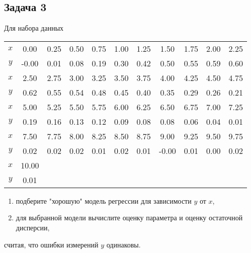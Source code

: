 \documentclass[a4paper,12pt]{article}
\begin{document}
\subsection*{Задача 3}

Для набора данных

\begin{center}
    \begin{tabular}{|c|c|c|c|c|c|c|c|c|c|c|}
        \hline
        $x$ & 0.00  & 0.25                  & 0.50 & 0.75 & 1.00 & 1.25 & 1.50  & 1.75 & 2.00 & 2.25 \\
        $y$ & -0.00 & 0.01                  & 0.08 & 0.19 & 0.30 & 0.42 & 0.50  & 0.55 & 0.59 & 0.60 \\
        \hline
        \hline
        $x$ & 2.50  & 2.75                  & 3.00 & 3.25 & 3.50 & 3.75 & 4.00  & 4.25 & 4.50 & 4.75 \\
        $y$ & 0.62  & 0.55                  & 0.54 & 0.48 & 0.45 & 0.40 & 0.35  & 0.29 & 0.26 & 0.21 \\
        \hline
        \hline
        $x$ & 5.00  & 5.25                  & 5.50 & 5.75 & 6.00 & 6.25 & 6.50  & 6.75 & 7.00 & 7.25 \\
        $y$ & 0.19  & 0.16                  & 0.13 & 0.12 & 0.09 & 0.08 & 0.08  & 0.06 & 0.04 & 0.01 \\
        \hline
        \hline
        $x$ & 7.50  & 7.75                  & 8.00 & 8.25 & 8.50 & 8.75 & 9.00  & 9.25 & 9.50 & 9.75 \\
        $y$ & 0.02  & 0.02                  & 0.02 & 0.01 & 0.02 & 0.01 & -0.00 & 0.01 & 0.00 & 0.02 \\
        \hline
        \hline
        $x$ & 10.00 & \multicolumn{9}{l|}{}                                                          \\
        $y$ & 0.01  & \multicolumn{9}{l|}{}                                                          \\
        \hline
    \end{tabular}
\end{center}

\begin{enumerate}
    \item подберите "хорошую"{} модель регрессии для зависимости $y$ от $x$,
    \item для выбранной модели вычислите оценку параметра и оценку остаточной дисперсии,
\end{enumerate}
считая, что ошибки измерений $y$ одинаковы.
\end{document}
